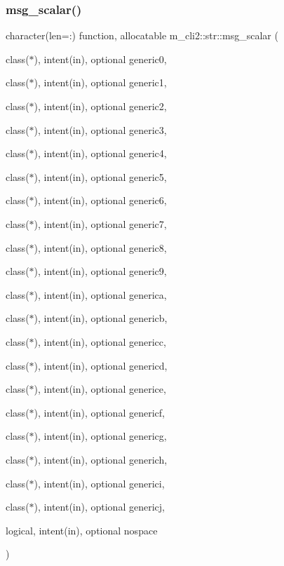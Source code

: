 \subsubsection{\texorpdfstring{msg\+\_\+scalar()}{msg\_scalar()}}
{\footnotesize\ttfamily character(len=\+:) function, allocatable m\+\_\+cli2\+::str\+::msg\+\_\+scalar (\begin{DoxyParamCaption}\item[{class($\ast$), intent(in), optional}]{generic0,  }\item[{class($\ast$), intent(in), optional}]{generic1,  }\item[{class($\ast$), intent(in), optional}]{generic2,  }\item[{class($\ast$), intent(in), optional}]{generic3,  }\item[{class($\ast$), intent(in), optional}]{generic4,  }\item[{class($\ast$), intent(in), optional}]{generic5,  }\item[{class($\ast$), intent(in), optional}]{generic6,  }\item[{class($\ast$), intent(in), optional}]{generic7,  }\item[{class($\ast$), intent(in), optional}]{generic8,  }\item[{class($\ast$), intent(in), optional}]{generic9,  }\item[{class($\ast$), intent(in), optional}]{generica,  }\item[{class($\ast$), intent(in), optional}]{genericb,  }\item[{class($\ast$), intent(in), optional}]{genericc,  }\item[{class($\ast$), intent(in), optional}]{genericd,  }\item[{class($\ast$), intent(in), optional}]{generice,  }\item[{class($\ast$), intent(in), optional}]{genericf,  }\item[{class($\ast$), intent(in), optional}]{genericg,  }\item[{class($\ast$), intent(in), optional}]{generich,  }\item[{class($\ast$), intent(in), optional}]{generici,  }\item[{class($\ast$), intent(in), optional}]{genericj,  }\item[{logical, intent(in), optional}]{nospace }\end{DoxyParamCaption})\hspace{0.3cm}{\ttfamily [private]}}



